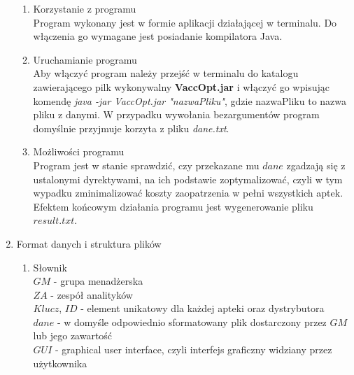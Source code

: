 \documentclass[11pt]{article}
\begin{document}
\begin{enumerate}
\begin{enumerate}[label=\arabic{enumi}.\arabic*.]
 \item  Korzystanie z programu\\
 Program wykonany jest w formie aplikacji działającej w terminalu. Do włączenia go wymagane jest posiadanie kompilatora Java.
\item  Uruchamianie programu\\
Aby włączyć program należy przejść w terminalu do katalogu zawierającego pilk wykonywalny \textbf{VaccOpt.jar} i włączyć go wpisując komendę \textsl{java -jar VaccOpt.jar "nazwaPliku"}, gdzie nazwaPliku to nazwa pliku z danymi. W przypadku wywołania bezargumentów program domyślnie przyjmuje korzyta z pliku \textsl{dane.txt}.
\item Możliwości programu\\
Program jest w stanie sprawdzić, czy przekazane mu $dane$ zgadzają się z ustalonymi dyrektywami, na ich podstawie zoptymalizować, czyli w tym wypadku zminimalizować koszty zaopatrzenia w pełni wszystkich aptek. Efektem końcowym działania programu jest wygenerowanie pliku $result.txt.$ 
\end{enumerate}
 
  \item Format danych i struktura plików
  
  \begin{enumerate}[label=\arabic{enumi}.\arabic*.]
  
 \item Słownik\\
$GM$ - grupa menadżerska\\
$ZA$ - zespół analityków\\
$Klucz$, $ID$ - element unikatowy dla każdej apteki oraz dystrybutora\\
$dane$ - w domyśle odpowiednio sformatowany plik dostarczony przez $GM$ lub jego zawartość\\
$GUI$ - graphical user interface, czyli interfejs graficzny widziany przez użytkownika\\
 

\end{enumerate}
\end{enumerate}
\end{document}
